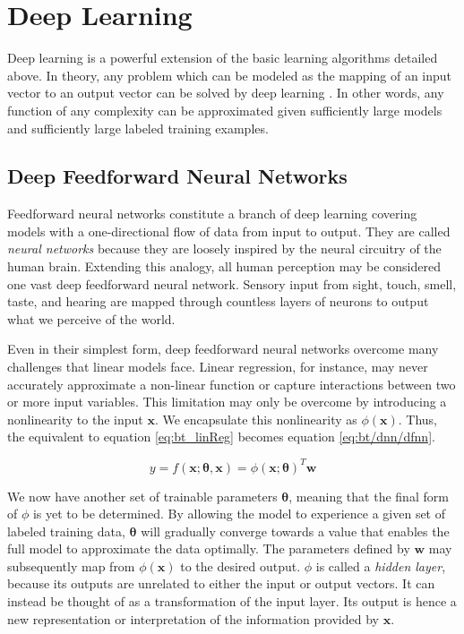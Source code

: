 \section{Deep Learning} \label{sec:bt/DNN}

Deep learning is a powerful extension of the basic learning algorithms detailed above. In theory, any problem which can be modeled as the mapping of an input vector to an output vector can be solved by deep learning \cite{goodfellow2016}. In other words, any function of any complexity can be approximated given sufficiently large models and sufficiently large labeled training examples. 

\subsection{Deep Feedforward Neural Networks}

Feedforward neural networks constitute a branch of deep learning covering models with a one-directional flow of data from input to output. They are called \textit{neural networks} because they are loosely inspired by the neural circuitry of the human brain. Extending this analogy, all human perception may be considered one vast deep feedforward neural network. Sensory input from sight, touch, smell, taste, and hearing are mapped through countless layers of neurons to output what we perceive of the world. 

Even in their simplest form, deep feedforward neural networks overcome many challenges that linear models face. Linear regression, for instance, may never accurately approximate a non-linear function or capture interactions between two or more input variables. This limitation may only be overcome by introducing a nonlinearity to the input $\bm{x}$. We encapsulate this nonlinearity as $\phi(\bm{x})$. Thus, the equivalent to equation \ref{eq:bt_linReg} becomes equation \ref{eq:bt/dnn/dfnn}.

\begin{equation}
    \label{eq:bt/dnn/dfnn}
    y=f(\bm{x};\bm{\theta},\bm{x})=\phi(\bm{x};\bm{\theta})^T\bm{w}
\end{equation}

We now have another set of trainable parameters $\bm{\theta}$, meaning that the final form of $\phi$ is yet to be determined. By allowing the model to experience a given set of labeled training data, $\bm{\theta}$ will gradually converge towards a value that enables the full model to approximate the data optimally.
The parameters defined by $\bm{w}$ may subsequently map from $\phi(\bm{x})$ to the desired output. $\phi$ is called a \textit{hidden layer}, because its outputs are unrelated to either the input or output vectors. It can instead be thought of as a transformation of the input layer. 
Its output is hence a new representation or interpretation of the information provided by $\bm{x}$.

